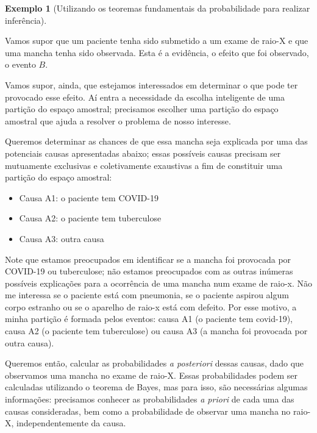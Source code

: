 \documentclass[
]{book}
\providecommand{\tightlist}{%
  \setlength{\itemsep}{0pt}\setlength{\parskip}{0pt}}
\theoremstyle{definition}
\theoremstyle{definition}
\newtheorem{example}{Exemplo}[chapter]
\theoremstyle{definition}
\theoremstyle{remark}
\begin{document}
\begin{example}[Utilizando os teoremas fundamentais da probabilidade para realizar inferência]
\protect\hypertarget{exm:unnamed-chunk-1}{}{\label{exm:unnamed-chunk-1} {} }
\end{example}

Vamos supor que um paciente tenha sido submetido a um exame de raio-X e que uma mancha tenha sido observada. Esta é a evidência, o efeito que foi observado, o evento \(B\).

Vamos supor, ainda, que estejamos interessados em determinar o que pode ter provocado esse efeito. Aí entra a necessidade da escolha inteligente de uma partição do espaço amostral; precisamos escolher uma partição do espaço amostral que ajuda a resolver o problema de nosso interesse.

Queremos determinar as chances de que essa mancha seja explicada por uma das potenciais causas apresentadas abaixo; essas possíveis causas precisam ser mutuamente exclusivas e coletivamente exaustivas a fim de constituir uma partição do espaço amostral:

\begin{itemize}
\tightlist
\item
  Causa A1: o paciente tem COVID-19\\
\item
  Causa A2: o paciente tem tuberculose\\
\item
  Causa A3: outra causa
\end{itemize}

Note que estamos preocupados em identificar se a mancha foi provocada por COVID-19 ou tuberculose; não estamos preocupados com as outras inúmeras possíveis explicações para a ocorrência de uma mancha num exame de raio-x. Não me interessa se o paciente está com pneumonia, se o paciente aspirou algum corpo estranho ou se o aparelho de raio-x está com defeito. Por esse motivo, a minha partição é formada pelos eventos: causa A1 (o paciente tem covid-19), causa A2 (o paciente tem tuberculose) ou causa A3 (a mancha foi provocada por outra causa).

Queremos então, calcular as probabilidades \emph{a posteriori} dessas causas, dado que observamos uma mancha no exame de raio-X. Essas probabilidades podem ser calculadas utilizando o teorema de Bayes, mas para isso, são necessárias algumas informações: precisamos conhecer as probabilidades \emph{a priori} de cada uma das causas consideradas, bem como a probabilidade de observar uma mancha no raio-X, independentemente da causa.
\end{document}
